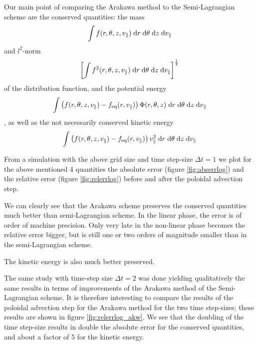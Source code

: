 Our main point of comparing the Arakawa method to the Semi-Lagrangian scheme are the conserved quantities: the mass
\begin{equation}
	\int f(r, \theta, z, v_\parallel) \;\text{d} r \;\text{d} \theta \;\text{d} z \;\text{d} v_\parallel
\end{equation}
and $l^2$-norm
\begin{equation}
	\left[\int f^2(r, \theta, z, v_\parallel) \;\text{d} r \;\text{d} \theta \;\text{d} z \;\text{d} v_\parallel\right]^\frac{1}{2}
\end{equation}
of the distribution function, and the potential energy
\begin{equation}
	\int \left(f(r, \theta, z, v_\parallel) - f_\text{eq}(r, v_\parallel)\right) \Phi(r, \theta, z) \;\text{d} r \;\text{d} \theta \;\text{d} z \;\text{d} v_\parallel
\end{equation}
, as well as the not necessarily conserved kinetic energy
\begin{equation}
	\int \left(f(r, \theta, z, v_\parallel) - f_\text{eq}(r, v_\parallel)\right) v^2_\parallel \;\text{d} r \;\text{d} \theta \;\text{d} z \;\text{d} v_\parallel
\end{equation}

From a simulation with the above grid size and time step-size $\Delta t = 1$ we plot for the above mentioned 4 quantities the absolute error (figure \ref{fig:abserrlog}) and the relative error (figure \ref{fig:relerrlog}) before and after the poloidal advection step.

We can clearly see that the Arakawa scheme preserves the conserved quantities much better than semi-Lagrangian scheme. In the linear phase, the error is of order of machine precision. Only very late in the non-linear phase becomes the relative error bigger, but is still one or two orders of magnitude smaller than in the semi-Lagrangian scheme.

The kinetic energy is also much better preserved.

The same study with time-step size $\Delta t = 2$ was done yielding qualitatively the same results in terms of improvements of the Arakawa method of the Semi-Lagrangian scheme. It is therefore interesting to compare the results of the poloidal advection step for the Arakawa method for the two time step-sizes; these results are shown in figure \ref{fig:relerrlog_akw}. We see that the doubling of the time step-size results in double the absolute error for the conserved quantities, and about a factor of 5 for the kinetic energy.


